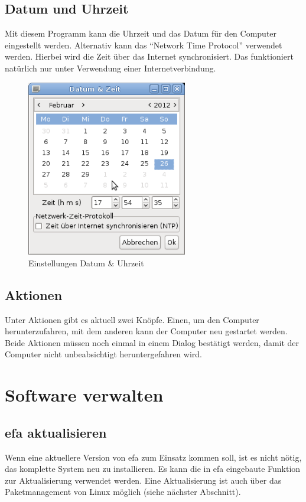 \documentclass[a4paper,12pt,twoside]{article}
\begin{document}
\subsection{Datum und Uhrzeit}
\label{sct:datetime}
Mit diesem Programm kann die Uhrzeit und das Datum für den Computer
eingestellt werden. Alternativ kann das "`Network Time
Protocol"' verwendet werden. Hierbei wird die Zeit über
das Internet synchronisiert. Das funktioniert natürlich nur unter
Verwendung einer Internetverbindung.

\begin{figure}
    \centering
    \includegraphics[width=7cm]{efaLivede-img/efaLivede-img25.png}
    \caption{Einstellungen Datum \& Uhrzeit}
    \label{fig:datetime}
\end{figure}


\subsection{Aktionen}
\label{sct:aktionen}
Unter Aktionen gibt es aktuell zwei Knöpfe. Einen, um den Computer
herunterzufahren, mit dem anderen kann der Computer neu gestartet
werden. Beide Aktionen müssen noch einmal in einem Dialog bestätigt
werden, damit der Computer nicht unbeabsichtigt heruntergefahren wird.


\section{Software verwalten}
\label{sct:software_verwalten}
\subsection{efa aktualisieren}
\label{update_efa}
Wenn eine aktuellere Version von efa zum Einsatz kommen soll, ist es
nicht nötig, das komplette System neu zu installieren. Es kann die in
efa eingebaute Funktion zur Aktualisierung verwendet werden. Eine 
Aktualisierung ist auch über das Paketmanagement von Linux möglich (siehe
nächster Abschnitt).
\end{document}
